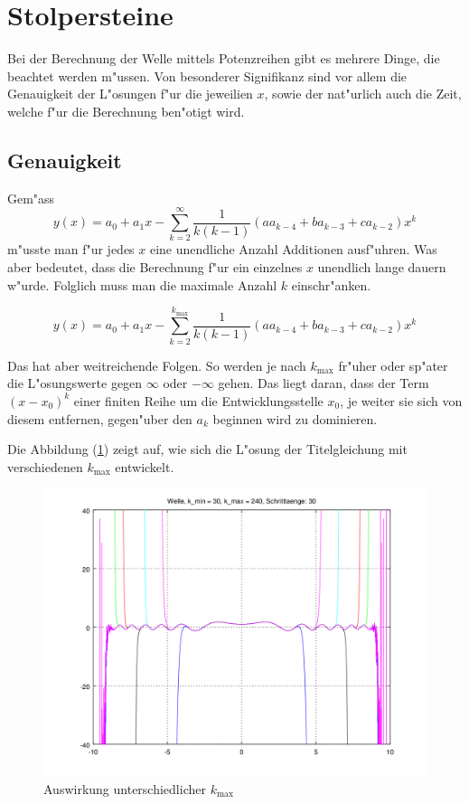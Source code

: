 \section{Stolpersteine}

Bei der Berechnung der Welle mittels Potenzreihen gibt es mehrere Dinge, die 
beachtet werden m"ussen. Von besonderer Signifikanz sind vor allem die 
Genauigkeit der L"osungen f"ur die jeweilien $x$, sowie der nat"urlich auch die 
Zeit, welche f"ur die Berechnung ben"otigt wird.


\subsection{Genauigkeit}
Gem"ass
\begin{equation*}
	y(x) = a_0 + a_1x 
	-\sum_{k=2}^{\infty}\frac{1}{k(k-1)}(aa_{k-4}+ba_{k-3}+ca_{k-2})x^k
\end{equation*}
m"usste man f"ur jedes $x$ eine unendliche Anzahl Additionen ausf"uhren. Was 
aber bedeutet, dass die Berechnung f"ur ein einzelnes $x$ unendlich lange 
dauern w"urde. Folglich muss man die maximale Anzahl $k$ einschr"anken.

\begin{equation*}
	y(x) = a_0 + a_1x 
	-\sum_{k=2}^{k_{\text{max}}}\frac{1}{k(k-1)}(aa_{k-4}+ba_{k-3}+ca_{k-2})x^k
\end{equation*}

Das hat aber weitreichende Folgen. So werden je nach $k_{\text{max}}$ fr"uher 
oder sp"ater die L"osungswerte gegen $\infty$ oder $-\infty$ gehen. Das liegt 
daran, dass der Term $(x - x_0)^k$ einer finiten Reihe um die 
Entwicklungsstelle $x_0$, je weiter sie sich von diesem entfernen, gegen"uber 
den $a_k$ beginnen wird zu dominieren.

Die Abbildung (\ref{fig:wellen:variablekmax}) zeigt auf, wie sich die L"osung 
der Titelgleichung mit verschiedenen $k_{\text{max}}$ entwickelt.

\begin{figure}
	\includegraphics[scale=0.65]{./wellen/images/kmax/krangewaveeven.png}
	\caption{Auswirkung unterschiedlicher $k_{\text{max}}$}
	\label{fig:wellen:variablekmax}
\end{figure}

